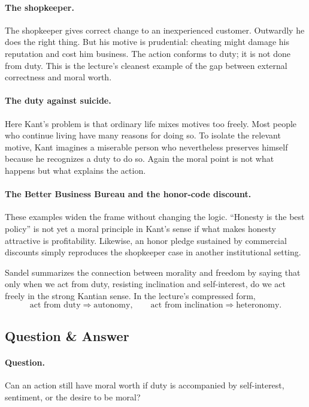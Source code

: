 \paragraph{The shopkeeper.} The shopkeeper gives correct change to an inexperienced customer. Outwardly he does the right thing. But his motive is prudential: cheating might damage his reputation and cost him business. The action conforms to duty; it is not done from duty. This is the lecture's cleanest example of the gap between external correctness and moral worth.

\paragraph{The duty against suicide.} Here Kant's problem is that ordinary life mixes motives too freely. Most people who continue living have many reasons for doing so. To isolate the relevant motive, Kant imagines a miserable person who nevertheless preserves himself because he recognizes a duty to do so. Again the moral point is not what happens but what explains the action.

\paragraph{The Better Business Bureau and the honor-code discount.} These examples widen the frame without changing the logic. ``Honesty is the best policy'' is not yet a moral principle in Kant's sense if what makes honesty attractive is profitability. Likewise, an honor pledge sustained by commercial discounts simply reproduces the shopkeeper case in another institutional setting.

Sandel summarizes the connection between morality and freedom by saying that only when we act from duty, resisting inclination and self-interest, do we act freely in the strong Kantian sense. In the lecture's compressed form,
\begin{equation}
\text{act from duty} \Longrightarrow \text{autonomy},
\qquad
\text{act from inclination} \Longrightarrow \text{heteronomy}.
\end{equation}

\subsection{Question \& Answer}

\paragraph{Question.} Can an action still have moral worth if duty is accompanied by self-interest, sentiment, or the desire to be moral?

